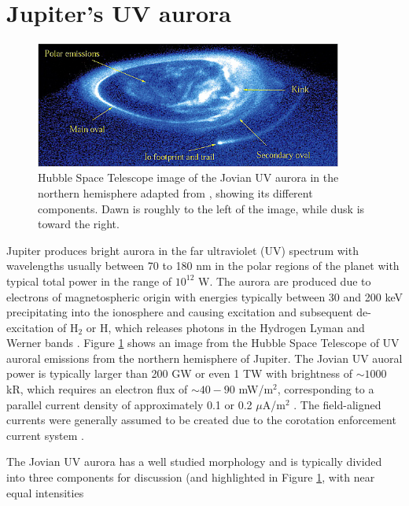 \section{Jupiter's UV aurora}

\begin{figure}
    \centering
    \includegraphics[width=0.9\textwidth]{images1/jupiter-uv-aurora-1.png}
    \caption{Hubble Space Telescope image of the Jovian UV aurora in the northern hemisphere adapted from \protect{}, showing its different components. Dawn is roughly to the left of the image, while dusk is toward the right.}
    \label{fig:jupiter-uv-aurora}
\end{figure}

Jupiter produces bright aurora in the far ultraviolet (UV) spectrum with wavelengths usually between 70 to 180 nm in the polar regions of the planet with typical total power in the range of $10^{12}$ W. The aurora are produced due to electrons of magnetospheric origin with energies typically between 30 and 200 keV \cite{Gustin2006CharacteristicsObservations} precipitating into the ionosphere and causing excitation and subsequent de-excitation of H$_2$ or H, which releases photons in the Hydrogen Lyman and Werner bands \cite{Grodent2015}. Figure \ref{fig:jupiter-uv-aurora} shows an image from the Hubble Space Telescope of UV auroral emissions from the northern hemisphere of Jupiter.  The Jovian UV auoral power is typically larger than 200 GW or even 1 TW \cite{Clarke2009} with brightness of $\sim1000$ kR, which requires an electron flux of $\sim40 - 90$ mW/m$^2$, corresponding to a parallel current density of approximately 0.1 or 0.2 $\mu$A/m$^2$ \cite{Gustin2006CharacteristicsObservations}. The field-aligned currents were generally assumed to be created due to the corotation enforcement current system \cite{Cowley2001a}. 

The Jovian UV aurora has a well studied morphology and is typically divided into three components for discussion (and highlighted in Figure 
\ref{fig:jupiter-uv-aurora}, with near equal intensities


